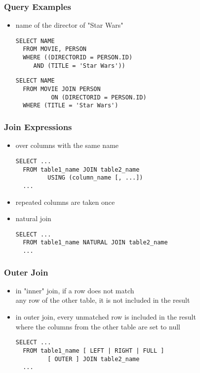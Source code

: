 \documentclass[dvipsnames]{beamer}
\theoremstyle{plain}
\begin{document}
\begin{frame}[fragile]
  \frametitle{Query Examples}

  \begin{itemize}
    \item name of the director of "Star Wars"
    \begin{lstlisting}
SELECT NAME
  FROM MOVIE, PERSON
  WHERE ((DIRECTORID = PERSON.ID)
     AND (TITLE = 'Star Wars'))
    \end{lstlisting}

    \pause
    \begin{lstlisting}
SELECT NAME
  FROM MOVIE JOIN PERSON
          ON (DIRECTORID = PERSON.ID)
  WHERE (TITLE = 'Star Wars')
    \end{lstlisting}
  \end{itemize}
\end{frame}

\begin{frame}[fragile]
  \frametitle{Join Expressions}

  \begin{itemize}
    \item over columns with the same name
    \begin{lstlisting}
SELECT ...
  FROM table1_name JOIN table2_name
         USING (column_name [, ...])
  ...
    \end{lstlisting}
    \item repeated columns are taken once

    \pause
    \medskip
    \item natural join
    \begin{lstlisting}
SELECT ...
  FROM table1_name NATURAL JOIN table2_name
  ...
    \end{lstlisting}
  \end{itemize}
\end{frame}

\begin{frame}[fragile]
  \frametitle{Outer Join}

  \begin{itemize}
    \item in "inner" join, if a row does not match\\
      any row of the other table, it is not included in the result

    \item in outer join, every unmatched row is included in the result\\
      where the columns from the other table are set to null
    \begin{lstlisting}
SELECT ...
  FROM table1_name [ LEFT | RIGHT | FULL ]
         [ OUTER ] JOIN table2_name
  ...
    \end{lstlisting}
  \end{itemize}
\end{frame}
\end{document}
